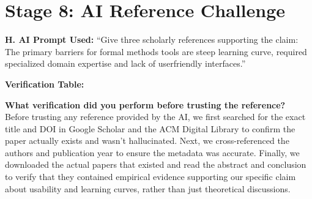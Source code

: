 \documentclass{article}
\begin{document}

\section*{Stage 8: AI Reference Challenge}

\textbf{H. AI Prompt Used:} ``Give three scholarly references supporting the claim: The primary barriers for formal methods tools are steep learning curve, required specialized domain expertise and lack of userfriendly interfaces.''

\vspace{0.5em}
\noindent\textbf{Verification Table:}

\begin{table}[h!]
\centering
\renewcommand{\arraystretch}{1.5}
\end{table}

\vspace{0.5em}
\noindent\textbf{What verification did you perform before trusting the reference?} \\
Before trusting any reference provided by the AI, we first searched for the exact title and DOI in Google Scholar and the ACM Digital Library to confirm the paper actually exists and wasn't hallucinated. Next, we cross-referenced the authors and publication year to ensure the metadata was accurate. Finally, we downloaded the actual papers that existed and read the abstract and conclusion to verify that they contained empirical evidence supporting our specific claim about usability and learning curves, rather than just theoretical discussions.
\end{document}
